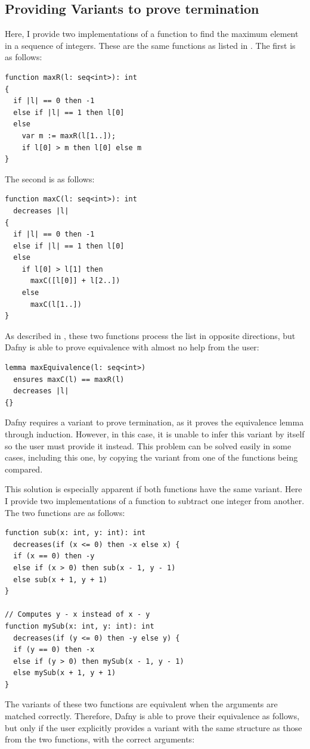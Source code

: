 \subsection{Providing Variants to prove termination}\label{sec:termination}

Here, I provide two implementations of a function to find the maximum element in a sequence of integers. These are the same functions as listed in . The first is as follows:
\begin{verbatim}
function maxR(l: seq<int>): int
{
  if |l| == 0 then -1
  else if |l| == 1 then l[0]
  else
    var m := maxR(l[1..]);
    if l[0] > m then l[0] else m
}
\end{verbatim}
%
The second is as follows:
\begin{verbatim}
function maxC(l: seq<int>): int
  decreases |l|
{
  if |l| == 0 then -1
  else if |l| == 1 then l[0]
  else
    if l[0] > l[1] then
      maxC([l[0]] + l[2..])
    else
      maxC(l[1..])
}
\end{verbatim}
%
As described in , these two functions process the list in opposite directions, but Dafny is able to prove equivalence with almost no help from the user:
\begin{verbatim}
lemma maxEquivalence(l: seq<int>)
  ensures maxC(l) == maxR(l)
  decreases |l|
{}
\end{verbatim}
%
Dafny requires a variant to prove termination, as it proves the equivalence lemma through induction. However, in this case, it is unable to infer this variant by itself so the user must provide it instead. This problem can be solved easily in some cases, including this one, by copying the variant from one of the functions being compared.

This solution is especially apparent if both functions have the same variant. Here I provide two implementations of a function to subtract one integer from another. The two functions are as follows:
\begin{verbatim}
function sub(x: int, y: int): int
  decreases(if (x <= 0) then -x else x) {
  if (x == 0) then -y
  else if (x > 0) then sub(x - 1, y - 1)
  else sub(x + 1, y + 1)
}

// Computes y - x instead of x - y
function mySub(x: int, y: int): int
  decreases(if (y <= 0) then -y else y) {
  if (y == 0) then -x
  else if (y > 0) then mySub(x - 1, y - 1)
  else mySub(x + 1, y + 1)
}
\end{verbatim}
%
The variants of these two functions are equivalent when the arguments are matched correctly. Therefore, Dafny is able to prove their equivalence as follows, but only if the user explicitly provides a variant with the same structure as those from the two functions, with the correct arguments:

